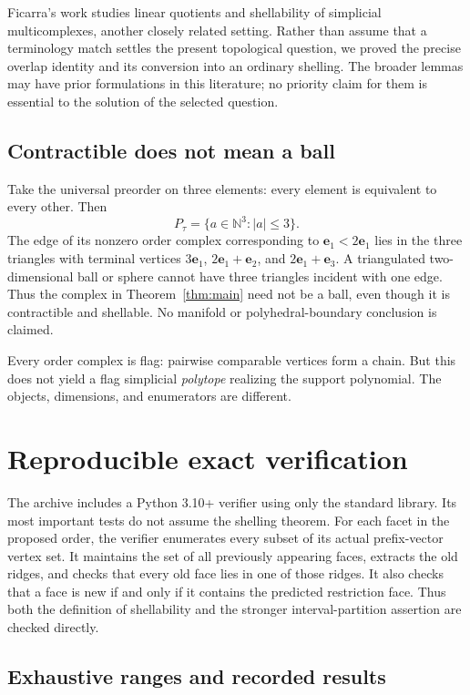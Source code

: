 \documentclass[11pt]{article}
\numberwithin{equation}{section}
\theoremstyle{definition}
\theoremstyle{remark}
\newcommand{\N}{\mathbb N}
\newcommand{\ee}{\mathbf e}
\begin{document}
Ficarra's work \cite{Ficarra} studies linear quotients and shellability of
simplicial multicomplexes, another closely related setting. Rather than assume
that a terminology match settles the present topological question, we proved
the precise overlap identity and its conversion into an ordinary shelling.
The broader lemmas may have prior formulations in this literature; no
priority claim for them is essential to the solution of the selected question.

\subsection{Contractible does not mean a ball}

Take the universal preorder on three elements: every element is equivalent
to every other. Then
\[
 P_\tau=\{a\in\N^3:|a|\le3\}.
\]
The edge of its nonzero order complex corresponding to
$\ee_1<2\ee_1$ lies in the three triangles with terminal vertices
$3\ee_1$, $2\ee_1+\ee_2$, and $2\ee_1+\ee_3$. A triangulated two-dimensional
ball or sphere cannot have three triangles incident with one edge. Thus the
complex in Theorem~\ref{thm:main} need not be a ball, even though it is
contractible and shellable. No manifold or polyhedral-boundary conclusion is
claimed.

Every order complex is flag: pairwise comparable vertices form a chain. But
this does not yield a flag simplicial \emph{polytope} realizing the support
polynomial. The objects, dimensions, and enumerators are different.

\section{Reproducible exact verification}
\label{sec:verification}

The archive includes a Python 3.10+ verifier using only the standard library.
Its most important tests do not assume the shelling theorem. For each facet
in the proposed order, the verifier enumerates every subset of its actual
prefix-vector vertex set. It maintains the set of all previously appearing
faces, extracts the old ridges, and checks that every old face lies in one
of those ridges. It also checks that a face is new if and only if it contains
the predicted restriction face. Thus both the definition of shellability and
the stronger interval-partition assertion are checked directly.

\subsection{Exhaustive ranges and recorded results}
\end{document}
